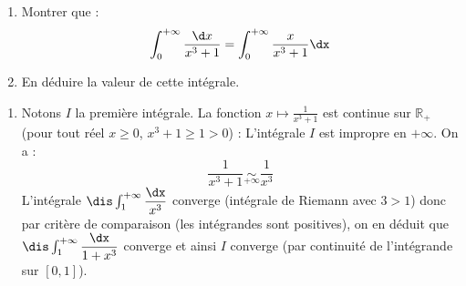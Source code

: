 \documentclass[a4paper,10pt]{report}
\begin{document}
\begin{Exa}
\begin{enumerate}
  \item
    Montrer que :
    \[
\int_{0}^{ + \infty} \frac{\d x}{x^{3} + 1} = \int_{0}^{ + \infty} \frac{x}{x^{3} + 1}\dx
    \]
  \item
    En déduire la valeur de cette intégrale.
  \end{enumerate}
\end{Exa} 

\corr 

\begin{enumerate}
\item Notons $I$ la première intégrale. La fonction $x \mapsto \frac{1}{x^{3} + 1}$ est continue sur $\mathbb{R}_+$ (pour tout réel $x \geq 0$, $x^3+1 \geq 1>0$) : L'intégrale $I$ est impropre en $+ \infty$. On a :
$$  \frac{1}{x^{3} + 1} \underset{+ \infty}{\sim} \dfrac{1}{x^3} $$
L'intégrale $\dis \int_1^{+\infty} \dfrac{\dx}{x^3}$ converge (intégrale de Riemann avec $3>1$) donc par critère de comparaison (les intégrandes sont positives), on en déduit que $\dis \int_1^{+\infty} \dfrac{\dx}{1+x^3}$ converge et ainsi $I$ converge (par continuité de l'intégrande sur $[0,1]$). 

\medskip


\end{enumerate}
\end{document}
